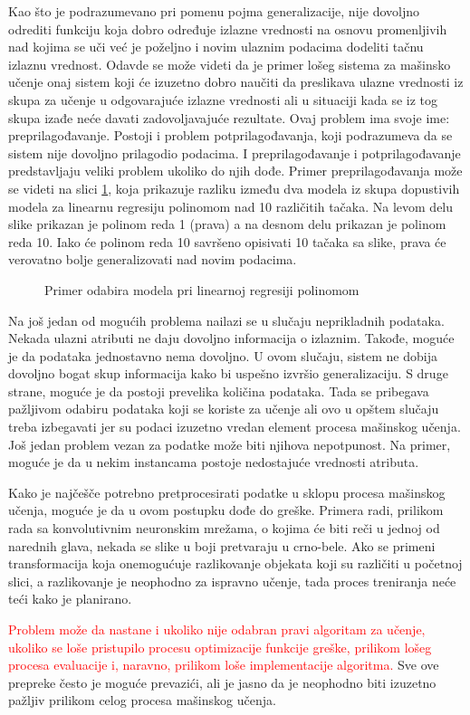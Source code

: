Kao što je podrazumevano pri pomenu pojma generalizacije, nije dovoljno odrediti funkciju koja dobro određuje izlazne vrednosti na osnovu promenljivih nad kojima se uči već je poželjno i novim ulaznim podacima dodeliti tačnu izlaznu vrednost. Odavde se može videti da je primer lošeg sistema za mašinsko učenje onaj sistem koji će izuzetno dobro naučiti da preslikava ulazne vrednosti iz skupa za učenje u odgovarajuće izlazne vrednosti ali u situaciji kada se iz tog skupa izađe neće davati zadovoljavajuće rezultate. Ovaj problem ima svoje ime: preprilagođavanje. Postoji i problem potprilagođavanja, koji podrazumeva da se sistem nije dovoljno prilagodio podacima. I preprilagođavanje i potprilagođavanje predstavljaju veliki problem ukoliko do njih dođe. Primer preprilagođavanja može se videti na slici \ref{fig:odabir}, koja prikazuje razliku između dva modela iz skupa dopustivih modela za linearnu regresiju polinomom nad 10 različitih tačaka. Na levom delu slike prikazan je polinom reda 1 (prava) a na desnom delu prikazan je polinom reda 10. Iako će polinom reda 10 savršeno opisivati 10 tačaka sa slike, prava će verovatno bolje generalizovati nad novim podacima.
\begin{figure}
	\centering
	\resizebox{.45\linewidth}{!}{}
	\resizebox{.45\linewidth}{!}{}
	\caption{Primer odabira modela pri linearnoj regresiji polinomom}
	\label{fig:odabir}
\end{figure}

\par
Na još jedan od mogućih problema nailazi se u slučaju neprikladnih podataka. Nekada ulazni atributi ne daju dovoljno informacija o izlaznim. Takođe, moguće je da podataka jednostavno nema dovoljno. U ovom slučaju, sistem ne dobija dovoljno bogat skup informacija kako bi uspešno izvršio generalizaciju. S druge strane, moguće je da postoji prevelika količina podataka. Tada se pribegava pažljivom odabiru podataka koji se koriste za učenje ali ovo u opštem slučaju  treba izbegavati jer su podaci izuzetno vredan element procesa mašinskog učenja. Još jedan problem vezan za podatke može biti njihova nepotpunost. Na primer, moguće je da u nekim instancama postoje nedostajuće vrednosti atributa. \par
Kako je najčešče potrebno pretprocesirati podatke u sklopu procesa mašinskog učenja, moguće je da u ovom postupku dođe do greške. Primera radi, prilikom rada sa konvolutivnim neuronskim mrežama, o kojima će biti reči u jednoj od narednih glava, nekada se slike  u boji pretvaraju u crno-bele. Ako se primeni transformacija koja onemogućuje razlikovanje objekata koji su različiti u početnoj slici, a razlikovanje je neophodno za ispravno učenje, tada proces treniranja neće teći kako je planirano. \par


\textcolor{red}{Problem može da nastane i ukoliko nije odabran pravi algoritam za učenje, ukoliko se loše pristupilo procesu optimizacije funkcije greške, prilikom lošeg procesa evaluacije i, naravno, prilikom loše implementacije algoritma.} Sve ove prepreke često je moguće prevazići, ali je jasno da je neophodno biti izuzetno pažljiv prilikom celog procesa mašinskog učenja.